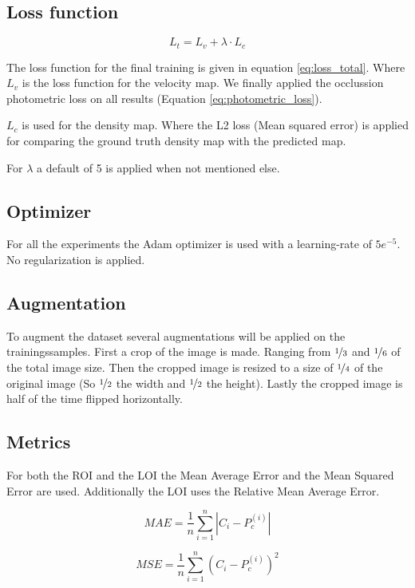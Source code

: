 \subsection{Loss function}
\begin{equation}
\label{eq:loss_total}
	L_{t} = L_{v} + \lambda \cdot L_{c}
\end{equation}

The loss function for the final training is given in equation \ref{eq:loss_total}. Where $L_{v}$ is the loss function for the velocity map. We finally applied the occlussion photometric loss on all results (Equation \ref{eq:photometric_loss}).

$L_{c}$ is used for the density map. Where the L2 loss (Mean squared error) is applied for comparing the ground truth density map with the predicted map.

For $\lambda$ a default of 5 is applied when not mentioned else.


\subsection{Optimizer}
For all the experiments the Adam optimizer is used with a learning-rate of $5e^{-5}$. No regularization is applied.

\subsection{Augmentation}
To augment the dataset several augmentations will be applied on the trainingssamples. First a crop of the image is made. Ranging from $\nicefrac{1}{3}$ and $\nicefrac{1}{6}$ of the total image size. Then the cropped image is resized to a size of $\nicefrac{1}{4}$ of the original image (So $\nicefrac{1}{2}$ the width and $\nicefrac{1}{2}$ the height). Lastly the cropped image is half of the time flipped horizontally.

\subsection{Metrics}
For both the ROI and the LOI the Mean Average Error and the Mean Squared Error are used. Additionally the LOI uses the Relative Mean Average Error.

\begin{equation}
\label{eq:mae_roi}
	MAE = \frac{1}{n}\sum^n_{i=1}|C_i-P_c^{(i)}|
\end{equation}

\begin{equation}
\label{eq:mse_roi}
	MSE = \frac{1}{n}\sum^n_{i=1}(C_i-P_c^{(i)})^2
\end{equation}

